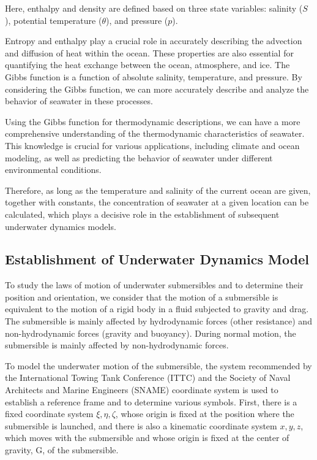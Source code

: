 \documentclass[12pt]{article}
\begin{document}
Here, enthalpy and density are defined based on three state variables: salinity ($S$), potential temperature ($\theta$), and pressure ($p$).

Entropy and enthalpy play a crucial role in accurately describing the advection and diffusion of heat within the ocean. These properties are also essential for quantifying the heat exchange between the ocean, atmosphere, and ice. The Gibbs function is a function of absolute salinity, temperature, and pressure. By considering the Gibbs function, we can more accurately describe and analyze the behavior of seawater in these processes.

Using the Gibbs function for thermodynamic descriptions, we can have a more comprehensive understanding of the thermodynamic characteristics of seawater. This knowledge is crucial for various applications, including climate and ocean modeling, as well as predicting the behavior of seawater under different environmental conditions.

Therefore, as long as the temperature and salinity of the current ocean are given, together with constants, the concentration of seawater at a given location can be calculated, which plays a decisive role in the establishment of subsequent underwater dynamics models.

\subsection{Establishment of Underwater Dynamics Model}

To study the laws of motion of underwater submersibles and to determine their position and orientation, we consider that the motion of a submersible is equivalent to the motion of a rigid body in a fluid subjected to gravity and drag. The submersible is mainly affected by hydrodynamic forces (other resistance) and non-hydrodynamic forces (gravity and buoyancy). During normal motion, the submersible is mainly affected by non-hydrodynamic forces.

To model the underwater motion of the submersible, the system recommended by the International Towing Tank Conference (ITTC) and the Society of Naval Architects and Marine Engineers (SNAME) coordinate system is used to establish a reference frame and to determine various symbols. First, there is a fixed coordinate system $\xi,\eta,\zeta$, whose origin is fixed at the position where the submersible is launched, and there is also a kinematic coordinate system $x,y,z$, which moves with the submersible and whose origin is fixed at the center of gravity, G, of the submersible.
\end{document}
